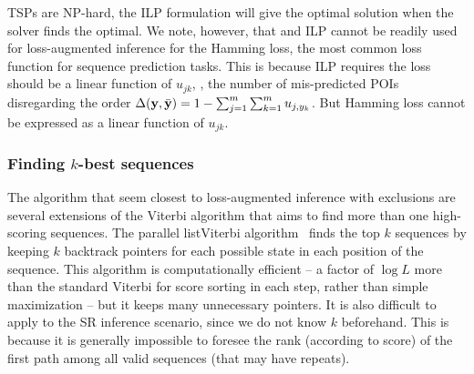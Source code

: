 TSPs are NP-hard, the ILP formulation will give the optimal solution when the solver finds the optimal.
We note, however, that and ILP cannot be readily used for loss-augmented inference
for the Hamming loss, the most common loss function for sequence prediction tasks.
This is because ILP requires the loss should be a linear function of $u_{jk}$,
\eg, the number of mis-predicted POIs disregarding the order $\Delta(\mathbf{y}, \bar{\mathbf{y}}) = 1 - \sum_{j=1}^m \sum_{k=1}^m u_{j, y_k}$.
But Hamming loss cannot be expressed as a linear function of $u_{jk}$.

\subsubsection{Finding $k$-best sequences}

The algorithm that seem closest to loss-augmented inference with exclusions are several extensions
of the Viterbi algorithm that aims to find more than one high-scoring sequences.
The parallel listViterbi algorithm~\cite{seshadri1994list} finds the top $k$ sequences
by keeping $k$ backtrack pointers for each possible state in each position of the sequence.
This algorithm is computationally efficient
-- a factor of $\log L$ more than the standard Viterbi for score sorting in each step, rather than simple maximization
-- but it keeps many unnecessary pointers. It is also difficult to apply to the SR inference scenario,
since we do not know $k$ beforehand. This is because it is generally impossible to foresee
the rank (according to score) of the first path among all valid sequences (that may have repeats).

